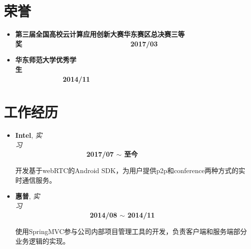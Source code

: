 \documentclass[letterpaper, UTF8, 11pt]{article}
\begin{document}
	\section*{\textbf{荣誉}}\vspace{-0.15in}
	\begin{itemize}
		\item \textbf{第三届全国高校云计算应用创新大赛华东赛区总决赛三等奖}~~~~~~~~~~~~~~~~~~~~~~~~~~~~~~~~\textbf{2017/03}
		\item \textbf{华东师范大学优秀学生}~~~~~~~~~~~~~~~~~~~~~~~~~~~~~~~~~~~~~~~~~~~~~~~~~~~~~~~~~~~~~~~~~~~~~~~~~~~~~~~~\textbf{2014/11}
	\end{itemize}
	\vspace{-0.3in}
	
	\section*{\textbf{工作经历}}\vspace{-0.15in}
	\begin{itemize}
		\item \textbf{Intel}, \emph{实习}~~~~~~~~~~~~~~~~~~~~~~~~~~~~~~~~~~~~~~~~~~~~~~~~~~~~~~~~~~~~~~~~~~~~~~~~~~~~~~~~~~~~~~~\textbf{2017/07 $\sim$ 至今}
		
		开发基于webRTC的Android SDK，为用户提供p2p和conference两种方式的实时通信服务。
		\item \textbf{惠普}, \emph{实习}~~~~~~~~~~~~~~~~~~~~~~~~~~~~~~~~~~~~~~~~~~~~~~~~~~~~~~~~~~~~~~~~~~~~~~~~~~~~~~~~~~~~~~~~\textbf{2014/08 $\sim$ 2014/11}
		
		使用SpringMVC参与公司内部项目管理工具的开发，负责客户端和服务端部分业务逻辑的实现。
	\end{itemize}
	\vspace{-0.3in}
	
\end{document}
